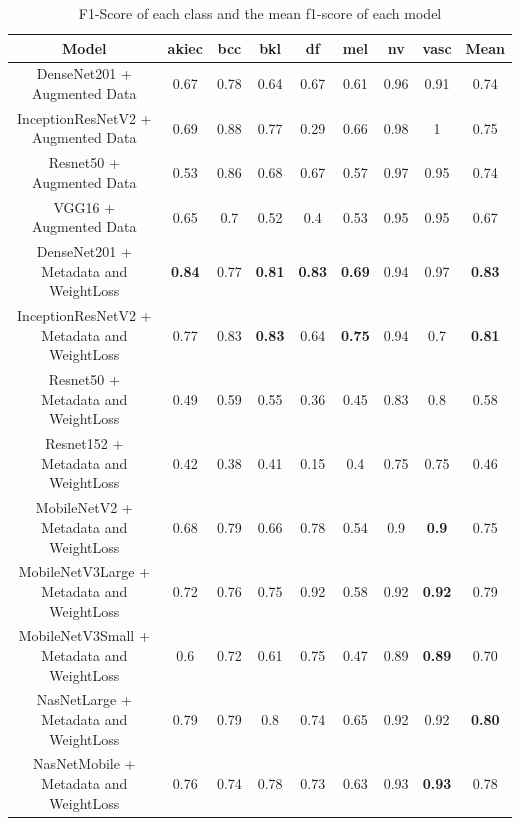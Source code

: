 \FloatBarrier
\begin{table}[h]
	\centering
	\begin{tabular}{|c | c | c | c | c | c | c | c | c|} 
		\hline
		Model & akiec & bcc & bkl & df & mel & nv & vasc & Mean \\
		\hline
		\thead{DenseNet201 +\\ Augmented Data} & 0.67 & 0.78 & 0.64 & 0.67 & 0.61 & 0.96 & 0.91 & 0.74 \\ 
		\hline
		\thead{InceptionResNetV2 +\\ Augmented Data} & 0.69 &	0.88 & 0.77 & 0.29 & 0.66 & 0.98 & 1 & 0.75\\
		\hline
		\thead{Resnet50 +\\ Augmented Data} & 0.53 & 0.86 & 0.68 & 0.67 & 0.57 & 0.97 & 0.95 & 0.74\\
		\hline 	
		\thead{VGG16 +\\ Augmented Data} & 0.65 & 0.7 & 0.52 & 0.4 & 0.53 & 0.95 & 0.95 & 0.67\\ 
		\hline		
		\thead{DenseNet201 +\\Metadata and WeightLoss} & \textbf{0.84} & 0.77 & \textbf{0.81} & \textbf{0.83} & \textbf{0.69} & 0.94 & 0.97 & \textbf{0.83}\\
		\hline
		\thead{InceptionResNetV2 +\\Metadata and WeightLoss} & 0.77 & 0.83 & \textbf{0.83} & 0.64 & \textbf{0.75} & 0.94 & 0.7 & \textbf{0.81}\\
		\hline
		\thead{Resnet50 +\\Metadata and WeightLoss} & 0.49 & 0.59 & 0.55 & 0.36 & 0.45 & 0.83 & 0.8 & 0.58\\
		\hline
		\thead{Resnet152 +\\Metadata and WeightLoss} & 0.42 & 0.38 & 0.41 & 0.15 & 0.4 & 0.75 & 0.75 & 0.46\\
		\hline
		\thead{MobileNetV2 +\\Metadata and WeightLoss} & 0.68 & 0.79 & 0.66 & 0.78 & 0.54 & 0.9 & \textbf{0.9} & 0.75\\
		\hline
		\thead{MobileNetV3Large +\\Metadata and WeightLoss} & 0.72 & 0.76 & 0.75 & 0.92 & 0.58 & 0.92 & \textbf{0.92} & 0.79\\
		\hline
		\thead{MobileNetV3Small +\\Metadata and WeightLoss} & 0.6 & 0.72 & 0.61 & 0.75 & 0.47 & 0.89 & \textbf{0.89} & 0.70\\
		\hline
		\thead{NasNetLarge +\\Metadata and WeightLoss} & 0.79 & 0.79 & 0.8 & 0.74 & 0.65 & 0.92 & 0.92 & \textbf{0.80}\\
		\hline
		\thead{NasNetMobile +\\Metadata and WeightLoss} & 0.76 & 0.74 & 0.78 & 0.73 & 0.63 & 0.93 & \textbf{0.93} & 0.78\\
		\hline
	\end{tabular}
	\caption{F1-Score of each class and the mean f1-score of each model}
	\label{table:5}
\end{table}
